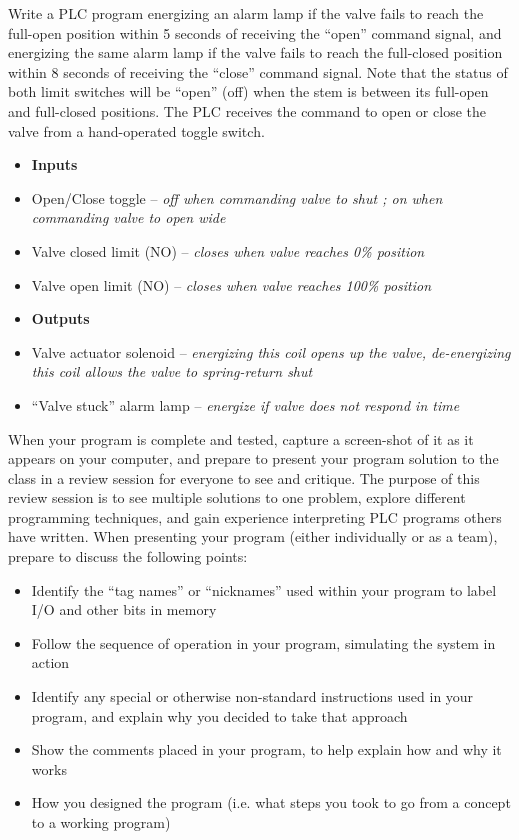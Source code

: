 \documentclass[12pt,a4paper]{article}
\begin{document}
Write a PLC program energizing an alarm lamp if the valve fails to reach the full-open position within 5 seconds of receiving the ``open'' command signal, and energizing the same alarm lamp if the valve fails to reach the full-closed position within 8 seconds of receiving the ``close'' command signal.  Note that the status of both limit switches will be ``open'' (off) when the stem is between its full-open and full-closed positions.  The PLC receives the command to open or close the valve from a hand-operated toggle switch.

\begin{itemize}
\item{} {\bf Inputs} 
\item{} Open/Close toggle -- {\it off when commanding valve to shut ; on when commanding valve to open wide}
\item{} Valve closed limit (NO) -- {\it closes when valve reaches 0\% position}
\item{} Valve open limit (NO) -- {\it closes when valve reaches 100\% position}
\end{itemize}

\begin{itemize}
\item{} {\bf Outputs} 
\item{} Valve actuator solenoid -- {\it energizing this coil opens up the valve, de-energizing this coil allows the valve to spring-return shut}
\item{} ``Valve stuck'' alarm lamp -- {\it energize if valve does not respond in time}
\end{itemize}

When your program is complete and tested, capture a screen-shot of it as it appears on your computer, and prepare to present your program solution to the class in a review session for everyone to see and critique.  The purpose of this review session is to see multiple solutions to one problem, explore different programming techniques, and gain experience interpreting PLC programs others have written.  When presenting your program (either individually or as a team), prepare to discuss the following points:

\begin{itemize}
\item{} Identify the ``tag names'' or ``nicknames'' used within your program to label I/O and other bits in memory
\item{} Follow the sequence of operation in your program, simulating the system in action
\item{} Identify any special or otherwise non-standard instructions used in your program, and explain why you decided to take that approach
\item{} Show the comments placed in your program, to help explain how and why it works
\item{} How you designed the program (i.e. what steps you took to go from a concept to a working program)
\end{itemize}
\end{document}
